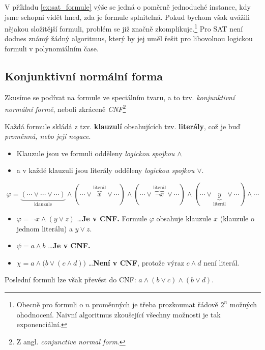 V příkladu \ref{ex:sat_formule} výše se jedná o poměrně jednoduché instance, kdy jsme schopni vidět hned, zda je formule splnitelná. Pokud bychom však uvážili nějakou složitější formuli, problém se již značně zkomplikuje.\footnote{Obecně pro formuli o $n$ proměnných je třeba prozkoumat řádově $2^n$ možných ohodnocení. Naivní algoritmus zkoušející všechny možnosti je tak exponenciální.} Pro SAT není dodnes známý žádný algoritmus, který by jej uměl řešit pro libovolnou logickou formuli v polynomiálním čase.

\subsection{Konjunktivní normální forma}\label{subsec:cnf}

Zkusíme se podívat na formule ve speciálním tvaru, a to tzv. \emph{konjunktivní normální formě}, neboli zkráceně \emph{CNF}\footnote{Z angl. \emph{conjunctive normal form}.}

Každá formule skládá z tzv. \textbf{klauzulí} obsahujících tzv. \textbf{literály}, což je buď \emph{proměnná, nebo její negace}.
\begin{itemize}
    \item Klauzule jsou ve formuli odděleny \emph{logickou spojkou $\land$}
    \item a v každé klauzuli jsou literály odděleny \emph{logickou spojkou $\lor$}.
\end{itemize}
\[\varphi=\underbrace{(\cdots\lor\cdots\lor\cdots)}_{\text{klauzule}}\land(\cdots\lor \overbrace{x}^{\text{literál}}\lor\cdots)\land(\cdots\lor\overbrace{\neg x}^{\text{literál}}\lor\cdots)\land(\cdots\lor \underbrace{y}_{\text{literál}}\lor\cdots)\land\cdots\]
\begin{example}\label{ex:cnf_formule}
    \begin{itemize}
        \item \(\varphi=\neg x\land (y\lor z)\) \dots \textbf{Je v CNF.} Formule $\varphi$ obsahuje klauzule $x$ (klauzule o jednom literálu) a $y\lor z$.
        \item \(\psi=a\land b\) \dots \textbf{Je v CNF.}
        \item \(\chi=a\land \big(b\lor (c\land d)\big)\) \dots \textbf{Není v CNF}, protože výraz $c\land d$ není literál.
    \end{itemize}
    Poslední formuli lze však převést do CNF: $a\land (b\lor c)\land (b\lor d)$.
\end{example}
